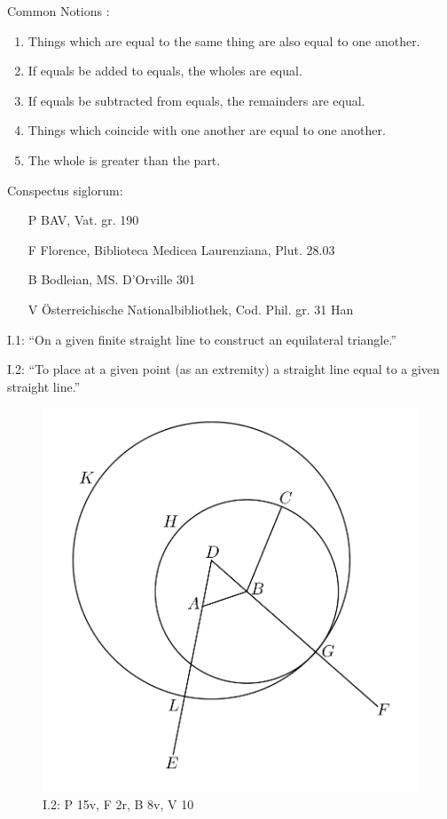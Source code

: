 \documentclass{article}
\begin{document}
Common Notions \cite[p.~155]{euclidI}:

\begin{enumerate}
\item Things which are equal to the same thing are also equal to one another.
\item If equals be added to equals, the wholes are equal.
\item If equals be subtracted from equals, the remainders
are equal.
\item Things which coincide with one another are equal to
one another.
\item The whole is greater than the part.
\end{enumerate}

Conspectus siglorum: 

\begin{itemize}
\item[P] BAV, Vat. gr. 190
\item[F] Florence, Biblioteca Medicea Laurenziana, Plut. 28.03
\item[B] Bodleian, MS. D'Orville 301
\item[V] \"Osterreichische Nationalbibliothek, Cod. Phil. gr. 31 Han
\end{itemize}

I.1: ``On a given finite straight line to construct an equilateral
triangle.''

I.2: ``To place at a given point (as an extremity) a straight line equal to a given straight line.''

\begin{figure}
\begin{center}
\includegraphics[scale=1]{I2.png}
\end{center}
\caption{I.2: P 15v, F 2r, B 8v, V 10}
\label{I2}
\end{figure}
\end{document}
